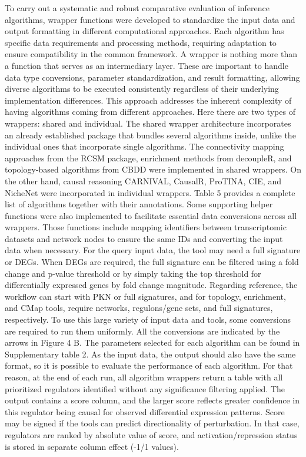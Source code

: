 To carry out a systematic and robust comparative evaluation of inference algorithms, wrapper functions were developed to standardize the input data 
and output formatting in different computational approaches. Each algorithm has specific data requirements and processing methods, requiring 
adaptation to ensure compatibility in the common framework. A wrapper is nothing more than a function that serves as an intermediary layer. 
These are important to handle data type conversions, parameter standardization, and result formatting, allowing diverse algorithms to be executed 
consistently regardless of their underlying implementation differences. This approach addresses the inherent complexity of having algorithms coming 
from different approaches. Here there are two types of wrappers: shared and individual. The shared wrapper architecture incorporates an already 
established package that bundles several algorithms inside, unlike the individual ones that incorporate single algorithms. The connectivity mapping 
approaches from the RCSM package, enrichment methods from decoupleR, and topology-based algorithms from CBDD were implemented in shared wrappers. 
On the other hand, causal reasoning CARNIVAL, CausalR, ProTINA, CIE, and NicheNet were incorporated in individual wrappers. Table 5 provides a 
complete list of algorithms together with their annotations.
Some supporting helper functions were also implemented to facilitate essential data conversions across all wrappers. Those functions include mapping 
identifiers between transcriptomic datasets and network nodes to ensure the same IDs and converting the input data when necessary. For the query 
input data, the tool may need a full signature or DEGs. When DEGs are required, the full signature can be filtered using a fold change and p-value 
threshold or by simply taking the top threshold for differentially expressed genes by fold change magnitude. Regarding reference, the workflow can 
start with PKN or full signatures, and for topology, enrichment, and CMap tools, require networks, regulons/gene sets, and full signatures, respectively. 
To use this large variety of input data and tools, some conversions are required to run them uniformly. All the conversions are indicated by the 
arrows in Figure 4 B. The parameters selected for each algorithm can be found in Supplementary table 2. 
As the input data, the output should also have the same format, so it is possible to evaluate the performance of each algorithm. For that reason, 
at the end of each run, all algorithm wrappers return a table with all prioritized regulators identified without any significance filtering applied. 
The output contains a score column, and the larger score reflects greater confidence in this regulator being causal for observed differential 
expression patterns. Score may be signed if the tools can predict directionality of perturbation. In that case, regulators are ranked by absolute 
value of score, and activation/repression status is stored in separate column effect (-1/1 values). 



